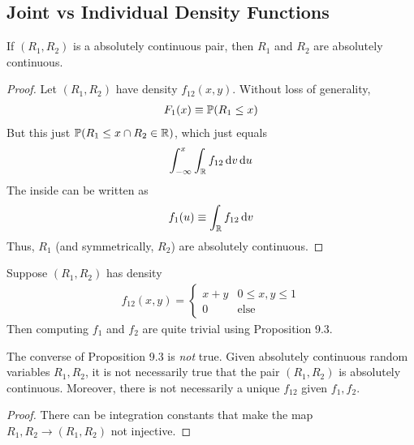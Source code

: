 \subsection{Joint vs Individual Density Functions}
\begin{proposition}
    If $(R_1,R_2)$ is a absolutely continuous pair, then $R_1$ and $R_2$ are absolutely continuous.
\end{proposition}
\begin{proof}
    Let $(R_1, R_2)$ have density $f_{12}(x,y)$. Without loss of generality,
    \begin{align}
        F_1(x) \equiv \mathbb{P}(R_1 \le x)
    \end{align}
    But this just $\mathbb{P}(R_1 \le x \cap R_2 \in \mathbb{R})$, which just equals
    \begin{align}
        \int_{-\infty}^x \int_{\mathbb{R}} f_{12} \dd{v}\dd{u}
    \end{align}
    The inside can be written as
    \begin{align}
        f_1(u) \equiv \int_{\mathbb{R}} f_{12} \dd{v}
    \end{align}
    Thus, $R_1$ (and symmetrically, $R_2$) are absolutely continuous.
\end{proof}

\begin{example}
    Suppose $(R_1,R_2)$ has density
    \begin{align}
        f_{12}(x,y) = \begin{cases}
            x + y & 0 \le x,y \le 1\\
            0 & \text{else}
        \end{cases}
    \end{align}
    Then computing $f_1$ and $f_2$ are quite trivial using Proposition 9.3.
\end{example}

\begin{proposition}
    The converse of Proposition 9.3 is \textit{not} true. Given absolutely continuous random variables $R_1,R_2$, it is not necessarily true that the pair $(R_1,R_2)$ is absolutely continuous. Moreover, there is not necessarily a unique $f_{12}$ given $f_1,f_2$.
    \begin{proof}
        There can be integration constants that make the map $R_1,R_2 \to (R_1,R_2)$ not injective.
    \end{proof}
\end{proposition}

